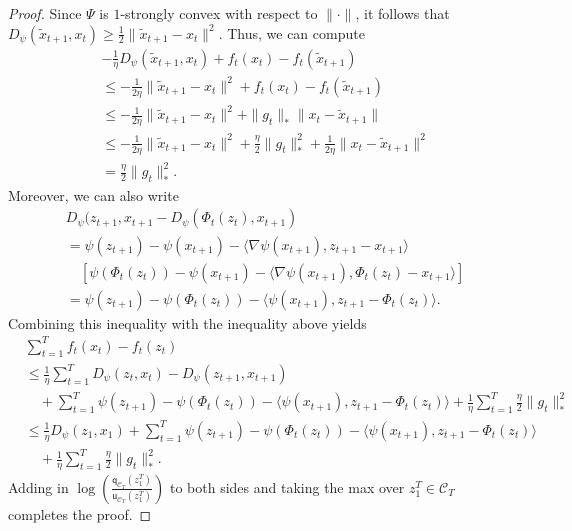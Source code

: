 \documentclass{article}
\newcommand{\sfq}{{\mathsf q}}
\newcommand{\sfu}{{\mathsf u}}
\newcommand{\cC}{\mathcal C}
\begin{document}
\begin{proof}
  Since $\Psi$ is $1$-strongly convex with respect to $\|\cdot\|$, it follows that
  $D_\psi(\tilde{x}_{t+1}, x_t) \geq \frac{1}{2} \|\tilde{x}_{t+1} - x_t\|^2$. Thus, we can compute 
  \begin{align*}
    &- \frac{1}{\eta} D_\psi(\tilde{x}_{t+1}, x_t) + f_t(x_t) - f_t(\tilde{x}_{t+1}) \\
    &\leq -\frac{1}{2\eta} \|\tilde{x}_{t+1} - x_t\|^2 + f_t(x_t) - f_t(\tilde{x}_{t+1}) \\
    &\leq -\frac{1}{2\eta} \|\tilde{x}_{t+1} - x_t\|^2 + \|g_t\|_* \|x_t - \tilde{x}_{t+1}\| \\
    &\leq -\frac{1}{2\eta} \|\tilde{x}_{t+1} - x_t\|^2 +\frac{\eta}{2} \|g_t\|_*^2 + \frac{1}{2\eta} \|x_t - \tilde{x}_{t+1}\|^2 \\
    & = \frac{\eta}{2} \|g_t\|_*^2.
  \end{align*}
  Moreover, we can also write
  \begin{align*}
    &D_\psi(z_{t+1}, x_{t+1} - D_\psi(\Phi_t(z_t), x_{t+1}) \\
    & = \psi(z_{t+1}) - \psi(x_{t+1}) - \langle \nabla \psi(x_{t+1}), z_{t+1} - x_{t+1} \rangle \\
    &\quad \left[ \psi(\Phi_t(z_t)) - \psi(x_{t+1}) - \langle \nabla \psi(x_{t+1}), \Phi_t(z_t) - x_{t+1} \rangle \right]\\
    & = \psi(z_{t+1}) - \psi(\Phi_t(z_t)) - \langle \psi(x_{t+1}), z_{t+1} - \Phi_t(z_t) \rangle.
  \end{align*}
  Combining this inequality with the inequality above yields
  \begin{align*}
    &\sum_{t = 1}^T f_t(x_t) - f_t(z_t) \\
    &\leq \frac{1}{\eta} \sum_{t = 1}^T  D_\psi(z_t, x_t) - D_\psi(z_{t+1}, x_{t+1}) \\
    &\quad + \sum_{t = 1}^T \psi(z_{t+1}) - \psi(\Phi_t(z_t)) - \langle \psi(x_{t+1}), z_{t+1} - \Phi_t(z_t) \rangle + \frac{1}{\eta} \sum_{t = 1}^T \frac{\eta}{2} \|g_t\|_*^2 \\
    &\leq \frac{1}{\eta} D_\psi(z_1,x_1)  + \sum_{t = 1}^T \psi(z_{t+1}) - \psi(\Phi_t(z_t)) - \langle \psi(x_{t+1}), z_{t+1} - \Phi_t(z_t) \rangle \\
    &\quad + \frac{1}{\eta} \sum_{t = 1}^T \frac{\eta}{2} \|g_t\|_*^2. 
  \end{align*}
  Adding in $\log\left(\frac{\sfq_{\cC_T}(z_1^T)}{\sfu_{\cC_T}(z_1^T)}\right)$ to both sides and 
  taking the max over $z_1^T \in \cC_T$ completes the proof.
\end{proof}
\end{document}
